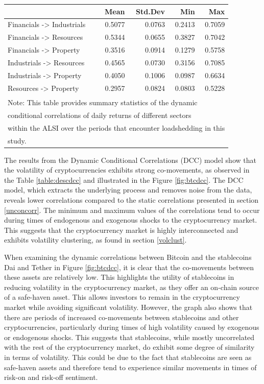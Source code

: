 \documentclass[11pt,preprint, authoryear]{elsarticle}
\let\origtable\table
\let\endorigtable\endtable
\renewenvironment{table}[1][2] {
    \expandafter\origtable\expandafter[H]
} {
    \endorigtable
}
\numberwithin{equation}{section}
\numberwithin{figure}{section}
\numberwithin{table}{section}
\begin{document}
\begin{table}
\centering\begingroup\fontsize{9}{11}\selectfont

\begin{tabular}{l|r|r|r|r}
\hline
  & Mean & Std.Dev & Min & Max\\
\hline
Financials -> Industrials & 0.5077 & 0.0763 & 0.2413 & 0.7059\\
\hline
Financials -> Resources & 0.5344 & 0.0655 & 0.3827 & 0.7042\\
\hline
Financials -> Property & 0.3516 & 0.0914 & 0.1279 & 0.5758\\
\hline
Industrials -> Resources & 0.4565 & 0.0730 & 0.3156 & 0.7085\\
\hline
Industrials -> Property & 0.4050 & 0.1006 & 0.0987 & 0.6634\\
\hline
Resources -> Property & 0.2957 & 0.0824 & 0.0803 & 0.5228\\
\hline
\multicolumn{5}{l}{\textsuperscript{} Note: This table provides summary statistics of the dynamic}\\
\multicolumn{5}{l}{conditional correlations of daily returns of different sectors}\\
\multicolumn{5}{l}{within the ALSI over the periods that encounter loadshedding in this}\\
\multicolumn{5}{l}{study.}\\
\end{tabular}
\endgroup{}
\end{table}

The results from the Dynamic Conditional Correlations (DCC) model show
that the volatility of cryptocurrencies exhibits strong co-movements, as
observed in the Table \ref{table:descdcc} and illustrated in the Figure
\ref{fig:btcdcc}. The DCC model, which extracts the underlying process
and removes noise from the data, reveals lower correlations compared to
the static correlations presented in section \ref{unconcorr}. The
minimum and maximum values of the correlations tend to occur during
times of endogenous and exogenous shocks to the cryptocurrency market.
This suggests that the cryptocurrency market is highly interconnected
and exhibits volatility clustering, as found in section \ref{volclust}.

When examining the dynamic correlations between Bitcoin and the
stablecoins Dai and Tether in Figure \ref{fig:btcdcc}, it is clear that
the co-movements between these assets are relatively low. This
highlights the utility of stablecoins in reducing volatility in the
cryptocurrency market, as they offer an on-chain source of a safe-haven
asset. This allows investors to remain in the cryptocurrency market
while avoiding significant volatility. However, the graph also shows
that there are periods of increased co-movements between stablecoins and
other cryptocurrencies, particularly during times of high volatility
caused by exogenous or endogenous shocks. This suggests that
stablecoins, while mostly uncorrelated with the rest of the
cryptocurrency market, do exhibit some degree of similarity in terms of
volatility. This could be due to the fact that stablecoins are seen as
safe-haven assets and therefore tend to experience similar movements in
times of risk-on and risk-off sentiment.
\end{document}
